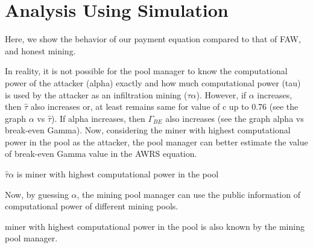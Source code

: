 \documentclass[runningheads]{llncs}
\begin{document}
\section{Analysis Using Simulation}

Here, we show the behavior of our payment equation compared to that of FAW, and honest mining.




In reality, it is not possible for the pool manager to know the computational power of the attacker (alpha) exactly and how much computational power (tau) is used by the attacker as an infiltration mining ($\tau\alpha$). However, if $\alpha$ increases, then $\hat{\tau}$ also increases or, at least remains same for value of c up to 0.76 (see the graph $\alpha$ vs $\hat{\tau}$). If alpha increases, then $\Gamma_{BE}$ also increases (see the graph alpha vs break-even Gamma).
Now, considering the miner with highest computational power in the pool as the attacker, the pool manager can better estimate the value of break-even Gamma value in the AWRS equation.

$\hat{\tau}\alpha$ is miner with highest computational power in the pool

Now, by guessing $\alpha$, the mining pool manager can use the public information of computational power of different mining pools.

miner with highest computational power in the pool is also known by the mining pool manager.
\end{document}
